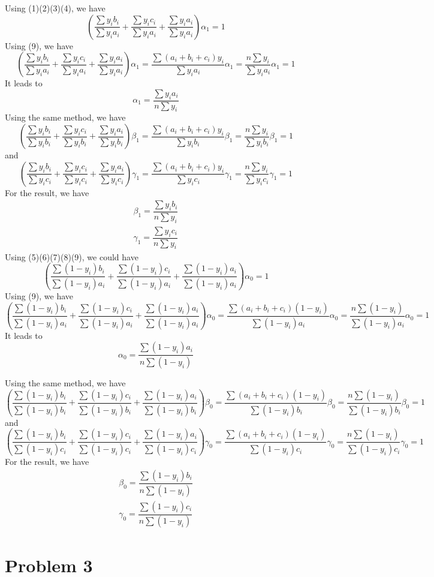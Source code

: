 Using (1)(2)(3)(4), we have 
\[ (\dfrac{\sum y_ib_i}{\sum y_ia_i}+\dfrac{\sum y_ic_i}{\sum y_ia_i}+\dfrac{\sum y_ia_i}{\sum y_ia_i})\alpha_1=1\]
Using (9), we have
\[ (\dfrac{\sum y_ib_i}{\sum y_ia_i}+\dfrac{\sum y_ic_i}{\sum y_ia_i}+\dfrac{\sum y_ia_i}{\sum y_ia_i})\alpha_1=\dfrac{\sum(a_i+b_i+c_i)y_i}{\sum y_ia_i}\alpha_1=\dfrac{n\sum y_i}{\sum y_ia_i}\alpha_1=1\]
It leads to \[\alpha_1=\dfrac{\sum y_ia_i}{n\sum y_i} \]
Using the same method, we have 
\[ (\dfrac{\sum y_ib_i}{\sum y_ib_i}+\dfrac{\sum y_ic_i}{\sum y_ib_i}+\dfrac{\sum y_ia_i}{\sum y_ib_i})\beta_1=\dfrac{\sum(a_i+b_i+c_i)y_i}{\sum y_ib_i}\beta_1=\dfrac{n\sum y_i}{\sum y_ib_i}\beta_1=1\]
and
\[ (\dfrac{\sum y_ib_i}{\sum y_ic_i}+\dfrac{\sum y_ic_i}{\sum y_ic_i}+\dfrac{\sum y_ia_i}{\sum y_ic_i})\gamma_1=\dfrac{\sum(a_i+b_i+c_i)y_i}{\sum y_ic_i}\gamma_1=\dfrac{n\sum y_i}{\sum y_ic_i}\gamma_1=1\]
For the result, we have
\begin{align*}
\beta_1=\dfrac{\sum y_ib_i}{n\sum y_i} \\
\gamma_1=\dfrac{\sum y_ic_i}{n\sum y_i}
\end{align*}
Using (5)(6)(7)(8)(9), we could have
\[(\dfrac{\sum (1-y_i)b_i}{\sum (1-y_i)a_i}+\dfrac{\sum (1-y_i)c_i}{\sum (1-y_i)a_i}+\dfrac{\sum (1-y_i)a_i}{\sum (1-y_i)a_i})\alpha_0=1\]
Using (9), we have
\[ (\dfrac{\sum (1-y_i)b_i}{\sum (1-y_i)a_i}+\dfrac{\sum (1-y_i)c_i}{\sum (1-y_i)a_i}+\dfrac{\sum (1-y_i)a_i}{\sum (1-y_i)a_i})\alpha_0=\dfrac{\sum(a_i+b_i+c_i)(1-y_i)}{\sum (1-y_i)a_i}\alpha_0=\dfrac{n\sum (1-y_i)}{\sum (1-y_i)a_i}\alpha_0=1\]
It leads to \[\alpha_0=\dfrac{\sum (1-y_i)a_i}{n\sum (1-y_i)} \]

Using the same method, we have 
\[ (\dfrac{\sum (1-y_i)b_i}{\sum (1-y_i)b_i}+\dfrac{\sum (1-y_i)c_i}{\sum (1-y_i)b_i}+\dfrac{\sum (1-y_i)a_i}{\sum (1-y_i)b_i})\beta_0=\dfrac{\sum(a_i+b_i+c_i)(1-y_i)}{\sum (1-y_i)b_i}\beta_0=\dfrac{n\sum (1-y_i)}{\sum (1-y_i)b_i}\beta_0=1\]
and
\[ (\dfrac{\sum (1-y_i)b_i}{\sum (1-y_i)c_i}+\dfrac{\sum (1-y_i)c_i}{\sum (1-y_i)c_i}+\dfrac{\sum (1-y_i)a_i}{\sum (1-y_i)c_i})\gamma_0=\dfrac{\sum(a_i+b_i+c_i)(1-y_i)}{\sum (1-y_i)c_i}\gamma_0=\dfrac{n\sum (1-y_i)}{\sum (1-y_i)c_i}\gamma_0=1\]
For the result, we have
\begin{align*}
\beta_0=\dfrac{\sum (1-y_i)b_i}{n\sum (1-y_i)} \\
\gamma_0=\dfrac{\sum (1-y_i)c_i}{n\sum (1-y_i)}
\end{align*}

\section{Problem 3}
